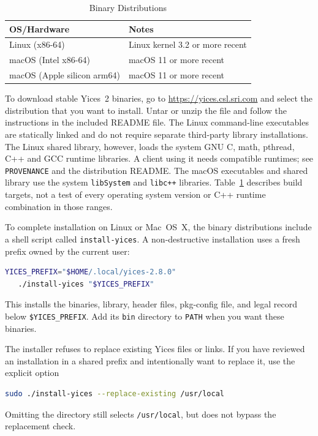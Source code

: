 \documentclass[11pt,twoside,fleqn,openright,titlepage]{cslreport}
\begin{document}
\begin{table}
\begin{center}
\renewcommand{\arraystretch}{1.1}
\begin{tabular}{|l|l|}
\hline
\textbf{OS/Hardware} & \textbf{Notes} \\
\hline
\hline
Linux (x86-64) & Linux kernel 3.2 or more recent \\
\hline
macOS (Intel x86-64) & macOS 11 or more recent\\
\hline
macOS (Apple silicon arm64) & macOS 11 or more recent\\
\hline
\end{tabular}
\end{center}
\caption{Binary Distributions}
\label{versions}
\end{table}

To download stable Yices~2 binaries, go to
\url{https://yices.csl.sri.com} and select the distribution that you
want to install.  Untar or unzip the file and follow the instructions
in the included README file. The Linux command-line executables are statically
linked and do not require separate third-party library installations. The Linux
shared library, however, loads the system GNU C, math, pthread, C++ and GCC
runtime libraries. A client using it needs compatible runtimes; see
\texttt{PROVENANCE} and the distribution README. The macOS executables and
shared library use the system \texttt{libSystem} and \texttt{libc++} libraries.
Table~\ref{versions} describes build targets, not a test of every operating
system version or C++ runtime combination in those ranges.

\medskip\noindent
To complete installation on Linux or Mac~OS~X, the binary
distributions include a shell script called \texttt{install-yices}. A
non-destructive installation uses a fresh prefix owned by the current user:
\begin{small}
\begin{lstlisting}[language=sh]
   YICES_PREFIX="$HOME/.local/yices-2.8.0"
   ./install-yices "$YICES_PREFIX"
\end{lstlisting}
\end{small}
This installs the binaries, library, header files, pkg-config file, and legal
record below \texttt{\$YICES\_PREFIX}. Add its \texttt{bin} directory to
\texttt{PATH} when you want these binaries.

\medskip\noindent
The installer refuses to replace existing Yices files or links. If you have
reviewed an installation in a shared prefix and intentionally want to replace
it, use the explicit option
\begin{small}
\begin{lstlisting}[language=sh]
   sudo ./install-yices --replace-existing /usr/local
\end{lstlisting}
\end{small}
Omitting the directory still selects \texttt{/usr/local}, but does not bypass
the replacement check.
\end{document}
